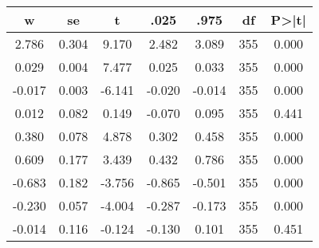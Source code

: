 \begin{tabular}{ccccccc}
\hline \hline
     w &    se &      t &   .025 &   .975 &  df &  P>|t| \\
\hline \hline
 2.786 & 0.304 &  9.170 &  2.482 &  3.089 & 355 &  0.000 \\
 0.029 & 0.004 &  7.477 &  0.025 &  0.033 & 355 &  0.000 \\
-0.017 & 0.003 & -6.141 & -0.020 & -0.014 & 355 &  0.000 \\
 0.012 & 0.082 &  0.149 & -0.070 &  0.095 & 355 &  0.441 \\
 0.380 & 0.078 &  4.878 &  0.302 &  0.458 & 355 &  0.000 \\
 0.609 & 0.177 &  3.439 &  0.432 &  0.786 & 355 &  0.000 \\
-0.683 & 0.182 & -3.756 & -0.865 & -0.501 & 355 &  0.000 \\
-0.230 & 0.057 & -4.004 & -0.287 & -0.173 & 355 &  0.000 \\
-0.014 & 0.116 & -0.124 & -0.130 &  0.101 & 355 &  0.451 \\
\hline \hline
\end{tabular}
